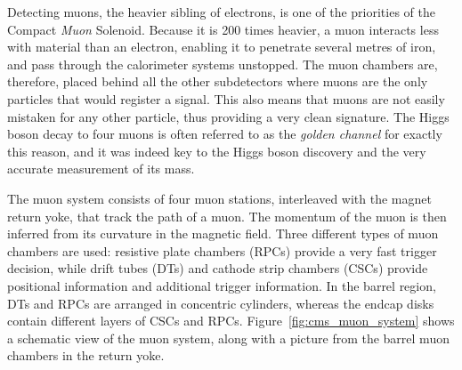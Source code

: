 Detecting muons, the heavier sibling of electrons, is one of the priorities of the Compact
\textit{Muon} Solenoid. Because it is 200 times heavier, a muon interacts less with material than
an electron, enabling it to penetrate several metres of iron, and pass through the calorimeter
systems unstopped. The muon chambers are, therefore, placed behind all the other subdetectors
where muons are the only particles that would register a signal. 
This also means that muons are not easily mistaken for any other particle, thus providing a very
clean signature. The Higgs boson decay to four muons is often referred to as the \textit{golden
channel} for exactly this reason, and it was indeed key to the Higgs boson discovery and the very
accurate measurement of its mass. 

The muon system consists of four muon stations, interleaved with the magnet return yoke, that track
the path of a muon. The momentum of the muon is then inferred from its curvature in the magnetic
field. Three different types of muon chambers are used: resistive plate chambers (RPCs) provide a
very fast trigger decision, while drift tubes (DTs) and cathode strip
chambers (CSCs) provide positional information and additional trigger information.
In the barrel region, DTs and RPCs are arranged in concentric cylinders, whereas the endcap disks
contain different layers of CSCs and RPCs. Figure~\ref{fig:cms_muon_system} shows a schematic view
of the muon system, along with a picture from the barrel muon chambers in the return yoke. 

